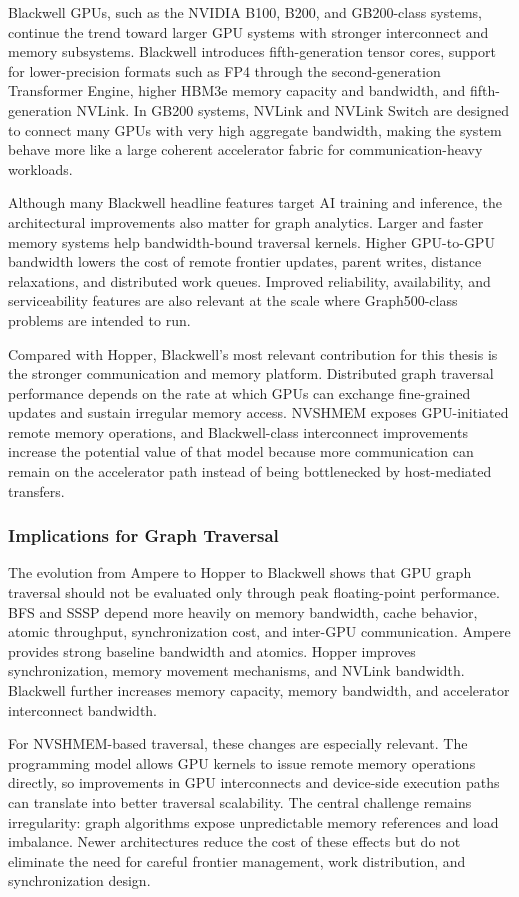\documentclass{article}
\begin{document}
Blackwell GPUs, such as the NVIDIA B100, B200, and GB200-class systems, continue the trend toward larger GPU systems with stronger interconnect and memory subsystems. Blackwell introduces fifth-generation tensor cores, support for lower-precision formats such as FP4 through the second-generation Transformer Engine, higher HBM3e memory capacity and bandwidth, and fifth-generation NVLink. In GB200 systems, NVLink and NVLink Switch are designed to connect many GPUs with very high aggregate bandwidth, making the system behave more like a large coherent accelerator fabric for communication-heavy workloads.

Although many Blackwell headline features target AI training and inference, the architectural improvements also matter for graph analytics. Larger and faster memory systems help bandwidth-bound traversal kernels. Higher GPU-to-GPU bandwidth lowers the cost of remote frontier updates, parent writes, distance relaxations, and distributed work queues. Improved reliability, availability, and serviceability features are also relevant at the scale where Graph500-class problems are intended to run.

Compared with Hopper, Blackwell's most relevant contribution for this thesis is the stronger communication and memory platform. Distributed graph traversal performance depends on the rate at which GPUs can exchange fine-grained updates and sustain irregular memory access. NVSHMEM exposes GPU-initiated remote memory operations, and Blackwell-class interconnect improvements increase the potential value of that model because more communication can remain on the accelerator path instead of being bottlenecked by host-mediated transfers.

\subsubsection*{Implications for Graph Traversal}

The evolution from Ampere to Hopper to Blackwell shows that GPU graph traversal should not be evaluated only through peak floating-point performance. BFS and SSSP depend more heavily on memory bandwidth, cache behavior, atomic throughput, synchronization cost, and inter-GPU communication. Ampere provides strong baseline bandwidth and atomics. Hopper improves synchronization, memory movement mechanisms, and NVLink bandwidth. Blackwell further increases memory capacity, memory bandwidth, and accelerator interconnect bandwidth.

For NVSHMEM-based traversal, these changes are especially relevant. The programming model allows GPU kernels to issue remote memory operations directly, so improvements in GPU interconnects and device-side execution paths can translate into better traversal scalability. The central challenge remains irregularity: graph algorithms expose unpredictable memory references and load imbalance. Newer architectures reduce the cost of these effects but do not eliminate the need for careful frontier management, work distribution, and synchronization design.
\end{document}
